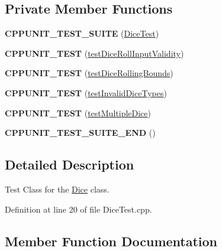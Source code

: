 \subsection*{Private Member Functions}
\begin{DoxyCompactItemize}
\item 
\hypertarget{class_dice_test_ae60af42068499ec4e3dac71d8a7d31d5}{}\label{class_dice_test_ae60af42068499ec4e3dac71d8a7d31d5} 
{\bfseries C\+P\+P\+U\+N\+I\+T\+\_\+\+T\+E\+S\+T\+\_\+\+S\+U\+I\+TE} (\hyperlink{class_dice_test}{Dice\+Test})
\item 
\hypertarget{class_dice_test_ae60a88cf9ee33179fc1d7ba0d0ac27c9}{}\label{class_dice_test_ae60a88cf9ee33179fc1d7ba0d0ac27c9} 
{\bfseries C\+P\+P\+U\+N\+I\+T\+\_\+\+T\+E\+ST} (\hyperlink{class_dice_test_a3e9f2421e914d4f18de2327828345860}{test\+Dice\+Roll\+Input\+Validity})
\item 
\hypertarget{class_dice_test_a2114378e2f9228c529f19055c2b07d2b}{}\label{class_dice_test_a2114378e2f9228c529f19055c2b07d2b} 
{\bfseries C\+P\+P\+U\+N\+I\+T\+\_\+\+T\+E\+ST} (\hyperlink{class_dice_test_a365b7b1d1ffe9faac8f306de9944d173}{test\+Dice\+Rolling\+Bounds})
\item 
\hypertarget{class_dice_test_af30057a8554704368f119ab1a26c6e8a}{}\label{class_dice_test_af30057a8554704368f119ab1a26c6e8a} 
{\bfseries C\+P\+P\+U\+N\+I\+T\+\_\+\+T\+E\+ST} (\hyperlink{class_dice_test_ac46b7044f229250c84b8dafaf432c80d}{test\+Invalid\+Dice\+Types})
\item 
\hypertarget{class_dice_test_a7de775b83af7ea891c87c1203119c262}{}\label{class_dice_test_a7de775b83af7ea891c87c1203119c262} 
{\bfseries C\+P\+P\+U\+N\+I\+T\+\_\+\+T\+E\+ST} (\hyperlink{class_dice_test_a849ab553a12a5a5d4deec59ddd1edf30}{test\+Multiple\+Dice})
\item 
\hypertarget{class_dice_test_a8200325837de38fdee61cdec137b64a4}{}\label{class_dice_test_a8200325837de38fdee61cdec137b64a4} 
{\bfseries C\+P\+P\+U\+N\+I\+T\+\_\+\+T\+E\+S\+T\+\_\+\+S\+U\+I\+T\+E\+\_\+\+E\+ND} ()
\end{DoxyCompactItemize}


\subsection{Detailed Description}
Test Class for the \hyperlink{class_dice}{Dice} class. 

Definition at line 20 of file Dice\+Test.\+cpp.



\subsection{Member Function Documentation}
\hypertarget{class_dice_test_a365b7b1d1ffe9faac8f306de9944d173}{}\label{class_dice_test_a365b7b1d1ffe9faac8f306de9944d173} 
